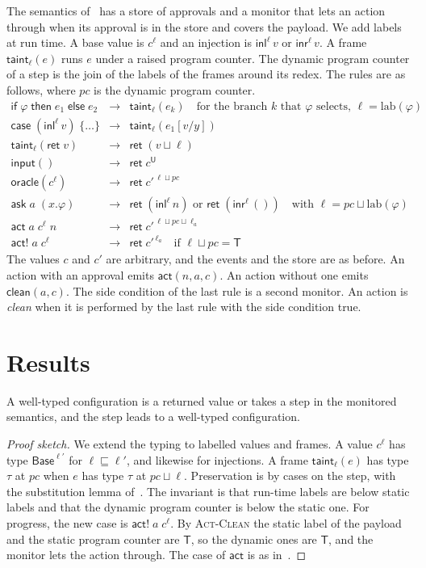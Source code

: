 \documentclass[acmsmall,nonacm,screen]{acmart}
\newcommand{\kw}[1]{\mathsf{#1}}
\newcommand{\ret}{\kw{ret}}
\newcommand{\ask}[2]{\kw{ask}\;#1\;(#2)}
\newcommand{\act}[3]{\kw{act}\;#1\;#2\;#3}
\newcommand{\actc}[2]{\kw{act!}\;#1\;#2}
\newcommand{\orc}[1]{\kw{oracle}(#1)}
\newcommand{\inp}{\kw{input}()}
\newcommand{\Base}{\kw{Base}}
\newcommand{\T}{\kw{T}}
\newcommand{\U}{\kw{U}}
\newcommand{\lab}{\mathrm{lab}}
\newcommand{\taint}[2]{\kw{taint}_{#1}(#2)}
\begin{document}
The semantics of~\citet{tpp4} has a store of approvals and a monitor that lets an action
through when its approval is in the store and covers the payload. We add labels at run time. A
base value is $c^\ell$ and an injection is $\kw{inl}^\ell\,v$ or $\kw{inr}^\ell\,v$. A frame
$\taint{\ell}{e}$ runs $e$ under a raised program counter. The dynamic program counter of a
step is the join of the labels of the frames around its redex. The rules are as follows, where
$pc$ is the dynamic program counter.
\[
\begin{array}{lcl}
\kw{if}\;\varphi\;\kw{then}\;e_1\;\kw{else}\;e_2 & \to & \taint{\ell}{e_k}
  \quad \text{for the branch } k \text{ that } \varphi \text{ selects, } \ell = \lab(\varphi) \\
\kw{case}\;(\kw{inl}^\ell\,v)\;\{\ldots\} & \to & \taint{\ell}{e_1[v/y]} \\
\taint{\ell}{\ret\;v} & \to & \ret\;(v \sqcup \ell) \\
\inp & \to & \ret\;c^{\U} \\
\orc{c^\ell} & \to & \ret\;c'^{\,\ell \sqcup pc} \\
\ask{a}{x.\varphi} & \to & \ret\;(\kw{inl}^{\ell}\,n) \text{ or } \ret\;(\kw{inr}^{\ell}\,())
  \quad \text{with } \ell = pc \sqcup \lab(\varphi) \\
\act{a}{c^\ell}{n} & \to & \ret\;c'^{\,\ell \sqcup pc \sqcup \ell_a} \\
\actc{a}{c^\ell} & \to & \ret\;c'^{\,\ell_a} \quad \text{if } \ell \sqcup pc = \T
\end{array}
\]
The values $c$ and $c'$ are arbitrary, and the events and the store are as before. An action
with an approval emits $\kw{act}(n, a, c)$. An action without one emits $\kw{clean}(a, c)$. The
side condition of the last rule is a second monitor. An action is \emph{clean} when it is
performed by the last rule with the side condition true.

\section{Results}

\begin{theorem}[Safety]
\label{thm:safety}
A well-typed configuration is a returned value or takes a step in the monitored semantics, and
the step leads to a well-typed configuration.
\end{theorem}

\begin{proof}[Proof sketch]
We extend the typing to labelled values and frames. A value $c^\ell$ has type $\Base^{\ell'}$
for $\ell \sqsubseteq \ell'$, and likewise for injections. A frame $\taint{\ell}{e}$ has type
$\tau$ at $pc$ when $e$ has type $\tau$ at $pc \sqcup \ell$. Preservation is by cases on the
step, with the substitution lemma of~\citet{tpp4}. The invariant is that run-time labels are
below static labels and that the dynamic program counter is below the static one. For progress,
the new case is $\actc{a}{c^\ell}$. By \textsc{Act-Clean} the static label of the payload and
the static program counter are $\T$, so the dynamic ones are $\T$, and the monitor lets the
action through. The case of $\kw{act}$ is as in~\citet{tpp4}.
\end{proof}
\end{document}
